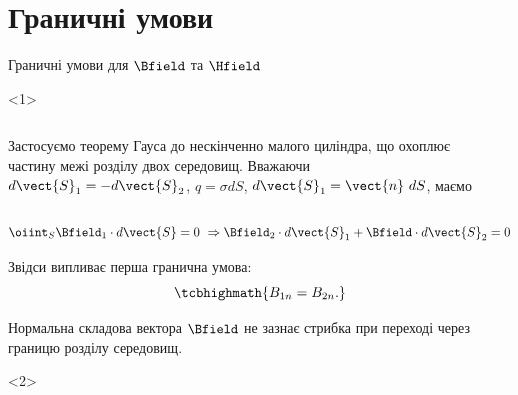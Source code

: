 \documentclass[onlytextwidth]{beamer}
\begin{document}
\section{Граничні умови}






\begin{frame}{Граничні умови для $\Bfield$ та $\Hfield$}{}
	\begin{onlyenv}
		\begin{columns}
			\begin{column}{0.6\linewidth}
				\begin{block}{}\scriptsize\justifying
					Застосуємо теорему Гауса до нескінченно малого циліндра, що охоплює частину межі
					розділу двох
					середовищ. Вважаючи $d\vect{S}_1 = - d\vect{S}_2$, $q = \sigma dS$,
					$d\vect{S}_1 =
						\vect{n}\ dS$,
					маємо
				\end{block}
			\end{column}
			\begin{column}{0.4\linewidth}\centering
				
			\end{column}
		\end{columns}
		\begin{block}{}\scriptsize
			\begin{equation*}
				\oiint_S \Bfield_1\cdot d\vect{S} = 0\ \Rightarrow  \Bfield_2\cdot
				d\vect{S}_1 +
				\Bfield\cdot d\vect{S}_2 = 0
			\end{equation*}
		\end{block}
		\begin{block}{}
			Звідси випливає перша гранична умова:
			\begin{equation*}
				\tcbhighmath{
					B_{1n} = B_{2n}.
				}
			\end{equation*}
		\end{block}
		\begin{alertblock}{}\justifying\scriptsize
			Нормальна складова вектора $\Bfield$ не зазнає стрибка при
			переході через границю розділу середовищ.
		\end{alertblock}
	\end{onlyenv}
	\begin{onlyenv}
		\begin{columns}
			\begin{column}{0.6\linewidth}

\end{column}
\end{columns}
\end{onlyenv}
\end{frame}
\end{document}
